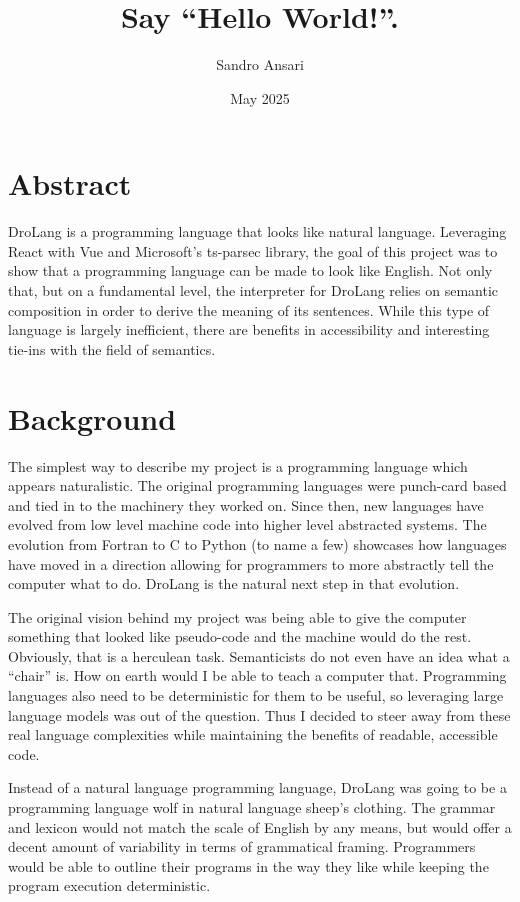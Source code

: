 \documentclass[titlepage]{article}
\title{Say ``Hello World!''.}
\author{Sandro Ansari}
\date{May 2025}
\newcommand{\langName}{DroLang}
\begin{document}
\maketitle
\newpage

\section*{Abstract}
\langName{} is a programming language that looks like natural language. Leveraging React with Vue and Microsoft's ts-parsec library, the goal of this project was to show that a programming language can be made to look like English. Not only that, but on a fundamental level, the interpreter for \langName{} relies on semantic composition in order to derive the meaning of its sentences. While this type of language is largely inefficient, there are benefits in accessibility and interesting tie-ins with the field of semantics.

\section*{Background}
The simplest way to describe my project is a programming language which appears naturalistic. The original programming languages were punch-card based and tied in to the machinery they worked on. Since then, new languages have evolved from low level machine code into higher level abstracted systems. The evolution from Fortran to C to Python (to name a few) showcases how languages have moved in a direction allowing for programmers to more abstractly tell the computer what to do. \langName{} is the natural next step in that evolution.

The original vision behind my project was being able to give the computer something that looked like pseudo-code and the machine would do the rest. Obviously, that is a herculean task. Semanticists do not even have an idea what a “chair” is. How on earth would I be able to teach a computer that. Programming languages also need to be deterministic for them to be useful, so leveraging large language models was out of the question. Thus I decided to steer away from these real language complexities while maintaining the benefits of readable, accessible code.

Instead of a natural language programming language, \langName{} was going to be a programming language wolf in natural language sheep's clothing. The grammar and lexicon would not match the scale of English by any means, but would offer a decent amount of variability in terms of grammatical framing. Programmers would be able to outline their programs in the way they like while keeping the program execution deterministic.
\end{document}
